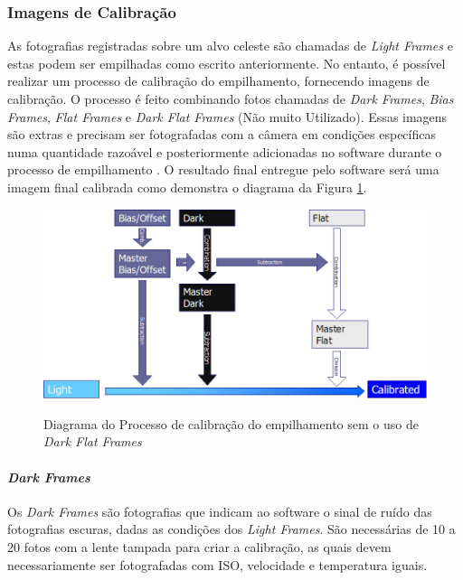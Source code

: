 \subsubsection{Imagens de Calibração}

As fotografias registradas sobre um alvo celeste são chamadas de \textit{Light Frames} e estas podem ser empilhadas como escrito anteriormente. No entanto, é possível realizar um processo de calibração do empilhamento, fornecendo imagens de calibração. \cite{man:deepskystackerfaq}
O processo é feito combinando fotos chamadas de \textit{Dark Frames},\textit{ Bias Frames}, \textit{Flat Frames} e \textit{Dark Flat Frames} (Não muito Utilizado). Essas imagens são extras e precisam ser fotografadas com a câmera em condições específicas numa quantidade razoável e posteriormente adicionadas no software durante o processo de empilhamento 
\cite{man:deepskystackerBetterImages}. O resultado final entregue pelo software será uma imagem final calibrada como demonstra o diagrama da Figura \ref{fig:calibrationDeepSkyStacker}.

\begin{figure}[!htb]
	\centering
	\caption{Diagrama do Processo de calibração do empilhamento sem o uso de \textit{Dark Flat Frames}}
	\includegraphics[width=0.7\linewidth]{figuras/Calibration_Alternate1}
	\label{fig:calibrationDeepSkyStacker}
\end{figure}


\paragraph{\textit{Dark Frames}}

Os \textit{Dark Frames} são fotografias que indicam ao software o sinal de ruído das fotografias escuras, dadas as condições dos \textit{Light Frames}. São necessárias de 10 a 20 fotos com a lente tampada para criar a calibração, as quais devem necessariamente ser fotografadas com ISO, velocidade e temperatura iguais.\cite{man:deepskystackerfaq}

